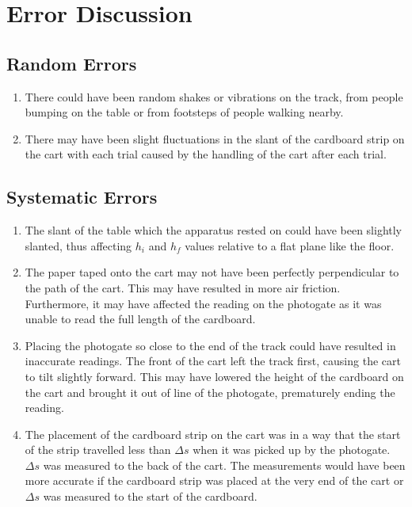 \documentclass{article}
\begin{document}
\section{Error Discussion}

\subsection{Random Errors}
\begin{enumerate}
    \item There could have been random shakes or vibrations on the track, from people bumping on the table or from footsteps of people walking nearby.
    \item There may have been slight fluctuations in the slant of the cardboard strip on the cart with each trial caused by the handling of the cart after each trial.
\end{enumerate}

\subsection{Systematic Errors}
\begin{enumerate}
    \item The slant of the table which the apparatus rested on could have been slightly slanted, thus affecting $h_i$ and $h_f$ values relative to a flat plane like the floor.
    \item The paper taped onto the cart may not have been perfectly perpendicular to the path of the cart. This may have resulted in more air friction. Furthermore, it may have affected the reading on the photogate as it was unable to read the full length of the cardboard.
    \item Placing the photogate so close to the end of the track could have resulted in inaccurate readings. The front of the cart left the track first, causing the cart to tilt slightly forward. This may have lowered the height of the cardboard on the cart and brought it out of line of the photogate, prematurely ending the reading.
    \item The placement of the cardboard strip on the cart was in a way that the start of the strip travelled less than $\Delta s$ when it was picked up by the photogate. $\Delta s$ was measured to the back of the cart. The measurements would have been more accurate if the cardboard strip was placed at the very end of the cart or $\Delta s$ was measured to the start of the cardboard.
\end{enumerate}
\end{document}
